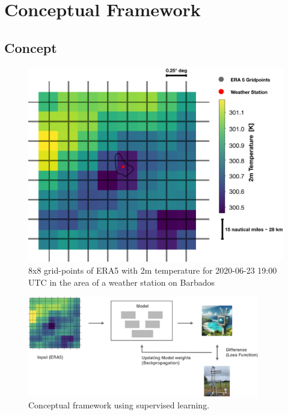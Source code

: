 \section{Conceptual Framework}
\label{sec:design}

\subsection{Concept}

\begin{figure}
    \centering
    \includegraphics[width=\textwidth]{resources/images/ERA5_tas_around_barbados.png}
    \caption{8x8 grid-points of ERA5 with 2m temperature 
    for 2020-06-23 19:00 UTC  in the area of a weather station on Barbados}    
    \label{fig:barbados}
\end{figure}

\begin{figure}
    \centering
    \includegraphics[width=0.9\textwidth]{resources/images/supervised_learning.png}
    \caption{Conceptual framework using supervised learning.}
    \label{fig:supervised_learning}
\end{figure}

